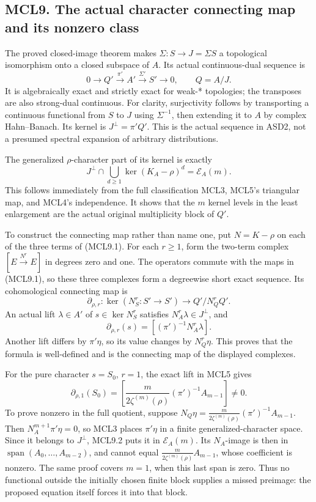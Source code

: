 \subsection{MCL9. The actual character connecting map and its nonzero
class}\label{mcl9.-the-actual-character-connecting-map-and-its-nonzero-class}

The proved closed-image theorem makes \(\Sigma:S\to J=\Sigma S\) a
topological isomorphism onto a closed subspace of \(A\). Its actual
continuous-dual sequence is \[
 0\longrightarrow Q'
 \xrightarrow{\pi'}A'\xrightarrow{\Sigma'}S'
 \longrightarrow0,\qquad Q=A/J.
 \tag{MCL9.1}
\] It is algebraically exact and strictly exact for weak-* topologies;
the transposes are also strong-dual continuous. For clarity,
surjectivity follows by transporting a continuous functional from \(S\)
to \(J\) using \(\Sigma^{-1}\), then extending it to \(A\) by complex
Hahn--Banach. Its kernel is \(J^\perp=\pi'Q'\). This is the actual
sequence in ASD2, not a presumed spectral expansion of arbitrary
distributions.

The generalized \(\rho\)-character part of its kernel is exactly \[
 J^\perp\cap\bigcup_{d\ge1}\ker(K_A-\rho)^d
 =\mathcal E_A(m).
 \tag{MCL9.2}
\] This follows immediately from the full classification MCL3, MCL5's
triangular map, and MCL4's independence. It shows that the \(m\) kernel
levels in the least enlargement are the actual original multiplicity
block of \(Q'\).

To construct the connecting map rather than name one, put \(N=K-\rho\)
on each of the three terms of (MCL9.1). For each \(r\ge1\), form the
two-term complex \([E\xrightarrow{N^r}E]\) in degrees zero and one. The
operators commute with the maps in (MCL9.1), so these three complexes
form a degreewise short exact sequence. Its cohomological connecting map
is \[
 \partial_{\rho,r}:
 \ker(N_S^r:S'\to S')
 \longrightarrow Q'/N_Q^rQ'.
\] An actual lift \(\lambda\in A'\) of \(s\in\ker N_S^r\) satisfies
\(N_A^r\lambda\in J^\perp\), and \[
 \boxed{\partial_{\rho,r}(s)
       =[(\pi')^{-1}N_A^r\lambda].}
 \tag{MCL9.3}
\] Another lift differs by \(\pi'\eta\), so its value changes by
\(N_Q^r\eta\). This proves that the formula is well-defined and is the
connecting map of the displayed complexes.

For the pure character \(s=S_0\), \(r=1\), the exact lift in MCL5 gives
\[
 \boxed{
 \partial_{\rho,1}(S_0)
 =
 \left[
 \frac{m}{2\zeta^{(m)}(\rho)}
  (\pi')^{-1}A_{m-1}
 \right]\ne0 .
 }
 \tag{MCL9.4}
\] To prove nonzero in the full quotient, suppose
\(N_Q\eta=\frac{m}{2\zeta^{(m)}(\rho)}(\pi')^{-1}A_{m-1}\). Then
\(N_A^{m+1}\pi'\eta=0\), so MCL3 places \(\pi'\eta\) in a finite
generalized-character space. Since it belongs to \(J^\perp\), MCL9.2
puts it in \(\mathcal E_A(m)\). Its \(N_A\)-image is then in
\(\operatorname{span}(A_0,\ldots,A_{m-2})\), and cannot equal
\(\frac{m}{2\zeta^{(m)}(\rho)}A_{m-1}\), whose coefficient is nonzero.
The same proof covers \(m=1\), when this last span is zero. Thus no
functional outside the initially chosen finite block supplies a missed
preimage: the proposed equation itself forces it into that block.

